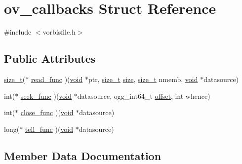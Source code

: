 \hypertarget{structov__callbacks}{}\section{ov\+\_\+callbacks Struct Reference}
\label{structov__callbacks}


{\ttfamily \#include $<$vorbisfile.\+h$>$}

\subsection*{Public Attributes}
\begin{DoxyCompactItemize}
\item 
\mbox{\hyperlink{_s_d_l__config_8h_a7c94ea6f8948649f8d181ae55911eeaf}{size\+\_\+t}}($\ast$ \mbox{\hyperlink{structov__callbacks_a301b93b9f0436e5bde6dbdeb0edeae77}{read\+\_\+func}} )(\mbox{\hyperlink{_s_d_l__opengles2__gl2ext_8h_ae5d8fa23ad07c48bb609509eae494c95}{void}} $\ast$ptr, \mbox{\hyperlink{_s_d_l__config_8h_a7c94ea6f8948649f8d181ae55911eeaf}{size\+\_\+t}} \mbox{\hyperlink{_s_d_l__opengl__glext_8h_a3d1e3edfcf61ca2d831883e1afbad89e}{size}}, \mbox{\hyperlink{_s_d_l__config_8h_a7c94ea6f8948649f8d181ae55911eeaf}{size\+\_\+t}} nmemb, \mbox{\hyperlink{_s_d_l__opengles2__gl2ext_8h_ae5d8fa23ad07c48bb609509eae494c95}{void}} $\ast$datasource)
\item 
int($\ast$ \mbox{\hyperlink{structov__callbacks_aa49d8079756c1c26e2ba9b974e463dfa}{seek\+\_\+func}} )(\mbox{\hyperlink{_s_d_l__opengles2__gl2ext_8h_ae5d8fa23ad07c48bb609509eae494c95}{void}} $\ast$datasource, ogg\+\_\+int64\+\_\+t \mbox{\hyperlink{_s_d_l__opengl__glext_8h_ac915cd848f42b26af51745f204a3b9af}{offset}}, int whence)
\item 
int($\ast$ \mbox{\hyperlink{structov__callbacks_a4d1141e00251a23b27e1de261e8717ec}{close\+\_\+func}} )(\mbox{\hyperlink{_s_d_l__opengles2__gl2ext_8h_ae5d8fa23ad07c48bb609509eae494c95}{void}} $\ast$datasource)
\item 
long($\ast$ \mbox{\hyperlink{structov__callbacks_ab078f3f386b7c58e9fab2ede904e0e36}{tell\+\_\+func}} )(\mbox{\hyperlink{_s_d_l__opengles2__gl2ext_8h_ae5d8fa23ad07c48bb609509eae494c95}{void}} $\ast$datasource)
\end{DoxyCompactItemize}


\subsection{Member Data Documentation}
\mbox{\label{structov__callbacks_a4d1141e00251a23b27e1de261e8717ec}} 
